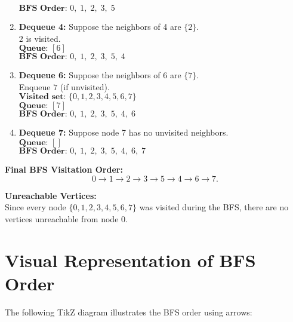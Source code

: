 \documentclass[11pt]{article}
\begin{document}
\begin{enumerate}[label=\arabic*.]
          \(\textbf{BFS Order: } 0,\; 1,\; 2,\; 3,\; 5\)
    \item \textbf{Dequeue 4:} Suppose the neighbors of 4 are \(\{2\}\). \\
          \(2\) is visited. \\
          \(\textbf{Queue: } [6]\) \\
          \(\textbf{BFS Order: } 0,\; 1,\; 2,\; 3,\; 5,\; 4\)
    \item \textbf{Dequeue 6:} Suppose the neighbors of 6 are \(\{7\}\). \\
          Enqueue \(7\) (if unvisited). \\
          \(\textbf{Visited set: } \{0,1,2,3,4,5,6,7\}\) \\
          \(\textbf{Queue: } [7]\) \\
          \(\textbf{BFS Order: } 0,\; 1,\; 2,\; 3,\; 5,\; 4,\; 6\)
    \item \textbf{Dequeue 7:} Suppose node 7 has no unvisited neighbors. \\
          \(\textbf{Queue: } []\) \\
          \(\textbf{BFS Order: } 0,\; 1,\; 2,\; 3,\; 5,\; 4,\; 6,\; 7\)
\end{enumerate}



\textbf{Final BFS Visitation Order:}
\[
    \boxed{0 \to 1 \to 2 \to 3 \to 5 \to 4 \to 6 \to 7.}
\]



\textbf{Unreachable Vertices:} \\
Since every node \(\{0,1,2,3,4,5,6,7\}\) was visited during the BFS, there are no vertices unreachable from node 0.



\section*{Visual Representation of BFS Order}

The following TikZ diagram illustrates the BFS order using arrows:



\begin{center}
\end{center}
\end{document}
